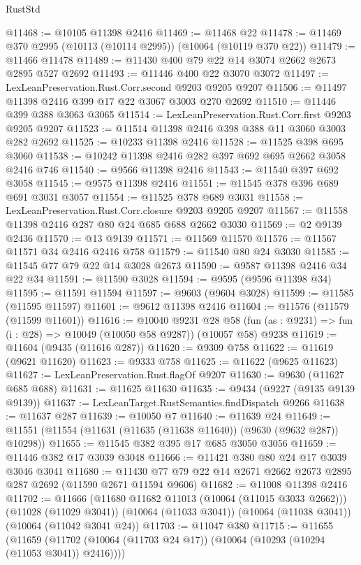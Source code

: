 \begin{lexlean}{RustStd}
\begin{coremodule}
@11468 := @10105 @11398 @2416
@11469 := @11468 @22
@11478 := @11469 @370 @2995 (@10113 (@10114 @2995)) (@10064 (@10119 @370 @22))
@11479 := @11466 @11478
@11489 := @11430 @400 @79 @22 @14 @3074 @2662 @2673 @2895 @527 @2692
@11493 := @11446 @400 @22 @3070 @3072
@11497 := LexLeanPreservation.Rust.Corr.second @9203 @9205 @9207
@11506 := @11497 @11398 @2416 @399 @17 @22 @3067 @3003 @270 @2692
@11510 := @11446 @399 @388 @3063 @3065
@11514 := LexLeanPreservation.Rust.Corr.first @9203 @9205 @9207
@11523 := @11514 @11398 @2416 @398 @388 @11 @3060 @3003 @282 @2692
@11525 := @10233 @11398 @2416
@11528 := @11525 @398 @695 @3060
@11538 := @10242 @11398 @2416 @282 @397 @692 @695 @2662 @3058 @2416 @746
@11540 := @9566 @11398 @2416
@11543 := @11540 @397 @692 @3058
@11545 := @9575 @11398 @2416
@11551 := @11545 @378 @396 @689 @691 @3031 @3057
@11554 := @11525 @378 @689 @3031
@11558 := LexLeanPreservation.Rust.Corr.closure @9203 @9205 @9207
@11567 := @11558 @11398 @2416 @287 @80 @24 @685 @688 @2662 @3030
@11569 := @2 @9139 @2436
@11570 := @13 @9139
@11571 := @11569 @11570
@11576 := @11567 @11571 @34 @2416 @2416 @758
@11579 := @11540 @80 @24 @3030
@11585 := @11545 @77 @79 @22 @14 @3028 @2673
@11590 := @9587 @11398 @2416 @34 @22 @34
@11591 := @11590 @3028
@11594 := @9595 (@9596 @11398 @34)
@11595 := @11591 @11594
@11597 := @9603 (@9604 @3028)
@11599 := @11585 (@11595 @11597)
@11601 := @9612 @11398 @2416
@11604 := @11576 (@11579 (@11599 @11601))
@11616 := @10040
    @9231
    @28
    @58
    (fun (as : @9231) => fun (i : @28) => @10049 (@10050 @58 @9287))
    (@10057 @58)
    @9238
@11619 := @11604 (@9435 (@11616 @287))
@11620 := @9309 @758
@11622 := @11619 (@9621 @11620)
@11623 := @9333 @758
@11625 := @11622 (@9625 @11623)
@11627 := LexLeanPreservation.Rust.flagOf @9207
@11630 := @9630 (@11627 @685 @688)
@11631 := @11625 @11630
@11635 := @9434 (@9227 (@9135 @9139 @9139))
@11637 := LexLeanTarget.RustSemantics.findDispatch @9266
@11638 := @11637 @287
@11639 := @10050 @7
@11640 := @11639 @24
@11649 := @11551 (@11554 (@11631 (@11635 (@11638 @11640)) (@9630 (@9632 @287)) @10298))
@11655 := @11545 @382 @395 @17 @685 @3050 @3056
@11659 := @11446 @382 @17 @3039 @3048
@11666 := @11421 @380 @80 @24 @17 @3039 @3046 @3041
@11680 := @11430 @77 @79 @22 @14 @2671 @2662 @2673 @2895 @287 @2692 (@11590 @2671 @11594 @9606)
@11682 := @11008 @11398 @2416
@11702 := @11666
    (@11680 @11682 @11013 (@10064 (@11015 @3033 @2662)))
    (@11028 (@11029 @3041))
    (@10064 (@11033 @3041))
    (@10064 (@11038 @3041))
    (@10064 (@11042 @3041 @24))
@11703 := @11047 @380
@11715 := @11655
    (@11659 (@11702 (@10064 (@11703 @24 @17)) (@10064 (@10293 (@10294 (@11053 @3041)) @2416))))

\end{coremodule}
\end{lexlean}
